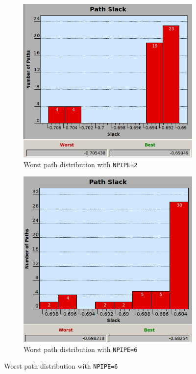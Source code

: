 \begin{figure}[htbp]
    \begin{subfigure}{0.5\textwidth}
       \centering
       \includegraphics[width=\textwidth]{chapter1/images/npipe2.png}
       \caption{Worst path distribution with \texttt{NPIPE=2}}
       \label{fig:hist2}
    \end{subfigure}
    \begin{subfigure}{0.5\textwidth}
        \centering
        \includegraphics[width=\textwidth]{chapter1/images/npipe6.png}
        \caption{Worst path distribution with \texttt{NPIPE=6}}
        \label{fig:hist6}
    \end{subfigure}
\end{figure}
